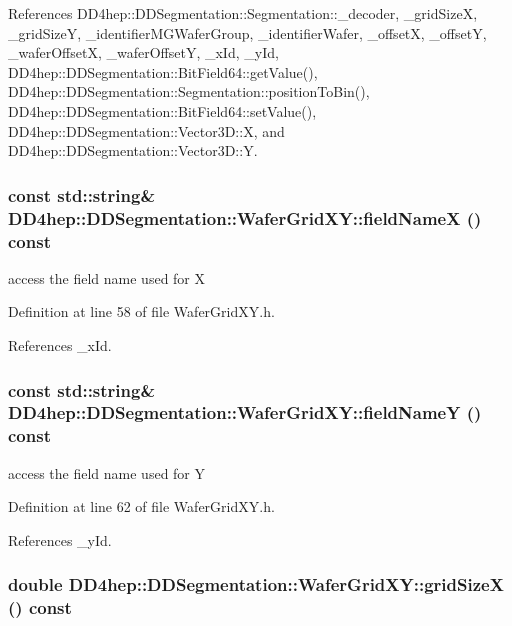 References DD4hep::DDSegmentation::Segmentation::\_\-decoder, \_\-gridSizeX, \_\-gridSizeY, \_\-identifierMGWaferGroup, \_\-identifierWafer, \_\-offsetX, \_\-offsetY, \_\-waferOffsetX, \_\-waferOffsetY, \_\-xId, \_\-yId, DD4hep::DDSegmentation::BitField64::getValue(), DD4hep::DDSegmentation::Segmentation::positionToBin(), DD4hep::DDSegmentation::BitField64::setValue(), DD4hep::DDSegmentation::Vector3D::X, and DD4hep::DDSegmentation::Vector3D::Y.\hypertarget{class_d_d4hep_1_1_d_d_segmentation_1_1_wafer_grid_x_y_a7f76cf7d5acf64796440862012b27851}{
\subsubsection[{fieldNameX}]{\setlength{\rightskip}{0pt plus 5cm}const std::string\& DD4hep::DDSegmentation::WaferGridXY::fieldNameX () const}}
\label{class_d_d4hep_1_1_d_d_segmentation_1_1_wafer_grid_x_y_a7f76cf7d5acf64796440862012b27851}


access the field name used for X 

Definition at line 58 of file WaferGridXY.h.

References \_\-xId.\hypertarget{class_d_d4hep_1_1_d_d_segmentation_1_1_wafer_grid_x_y_ac2487159add159a35a9d19712641be0c}{
\subsubsection[{fieldNameY}]{\setlength{\rightskip}{0pt plus 5cm}const std::string\& DD4hep::DDSegmentation::WaferGridXY::fieldNameY () const}}
\label{class_d_d4hep_1_1_d_d_segmentation_1_1_wafer_grid_x_y_ac2487159add159a35a9d19712641be0c}


access the field name used for Y 

Definition at line 62 of file WaferGridXY.h.

References \_\-yId.\hypertarget{class_d_d4hep_1_1_d_d_segmentation_1_1_wafer_grid_x_y_a026d6619714e9b753b42470e9f91426b}{
\subsubsection[{gridSizeX}]{\setlength{\rightskip}{0pt plus 5cm}double DD4hep::DDSegmentation::WaferGridXY::gridSizeX () const}}
\label{class_d_d4hep_1_1_d_d_segmentation_1_1_wafer_grid_x_y_a026d6619714e9b753b42470e9f91426b}


